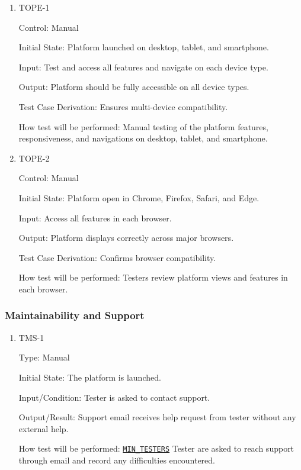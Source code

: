 \documentclass[12pt, titlepage]{article}
\begin{document}
\begin{enumerate}

  \item{TOPE-1\\}

        Control: Manual

        Initial State: Platform launched on desktop, tablet, and smartphone.

        Input: Test and access all features and navigate on each device type.

        Output: Platform should be fully accessible on all device types.

        Test Case Derivation: Ensures multi-device compatibility.

        How test will be performed: Manual testing of the platform features, responsiveness, and navigations on desktop, tablet, and smartphone.

  \item{TOPE-2\\}

        Control: Manual

        Initial State: Platform open in Chrome, Firefox, Safari, and Edge.

        Input: Access all features in each browser.

        Output: Platform displays correctly across major browsers.

        Test Case Derivation: Confirms browser compatibility.

        How test will be performed: Testers review platform views and features in each browser.

\end{enumerate}

\subsubsection{Maintainability and Support}

\begin{enumerate}

  \item{TMS-1\\}

        Type: Manual

        Initial State: The platform is launched.

        Input/Condition: Tester is asked to contact support.

        Output/Result: Support email receives help request from tester without any external help.

        How test will be performed: \hyperref[MIN_TESTERS]{\texttt{MIN\_TESTERS}} Tester are asked to reach
        support through email and record any difficulties encountered.

\end{enumerate}
\end{document}
